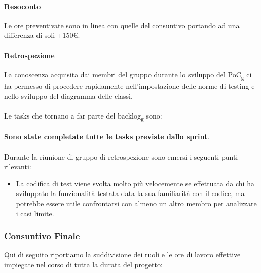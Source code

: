 \paragraph{Resoconto}
Le ore preventivate sono in linea con quelle del consuntivo portando ad una differenza di soli +150\euro.

\paragraph{Retrospezione}
La conoscenza acquisita dai membri del gruppo durante lo sviluppo del PoC\textsubscript{g} ci ha permesso di procedere rapidamente nell'impostazione delle norme di testing e nello sviluppo del diagramma delle classi. 
\\\\
Le tasks che tornano a far parte del backlog\textsubscript{g} sono:
\\\\
\textbf{Sono state completate tutte le tasks previste dallo sprint}.
\\\\
\noindent Durante la riunione di gruppo di retrospezione sono emersi i seguenti punti rilevanti:
\begin{itemize}
	\item La codifica di test viene svolta molto più velocemente se effettuata da chi ha sviluppato la funzionalità testata data la sua familiarità con il codice, ma potrebbe essere utile confrontarsi con almeno un altro membro per analizzare i casi limite.
\end{itemize}
\pagebreak

\subsubsection{Consuntivo Finale}
Qui di seguito riportiamo la suddivisione dei ruoli e le ore di lavoro effettive impiegate nel corso di tutta la durata del progetto:

